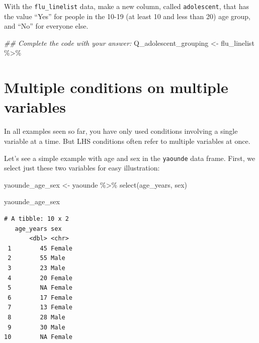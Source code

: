 \documentclass[
  letterpaper,
  DIV=11,
  numbers=noendperiod]{scrreprt}
\newenvironment{Shaded}{\begin{snugshade}}{\end{snugshade}}
\newcommand{\DocumentationTok}[1]{\textcolor[rgb]{0.37,0.37,0.37}{\textit{#1}}}
\newcommand{\FunctionTok}[1]{\textcolor[rgb]{0.28,0.35,0.67}{#1}}
\newcommand{\NormalTok}[1]{\textcolor[rgb]{0.00,0.23,0.31}{#1}}
\newcommand{\OtherTok}[1]{\textcolor[rgb]{0.00,0.23,0.31}{#1}}
\newcommand{\SpecialCharTok}[1]{\textcolor[rgb]{0.37,0.37,0.37}{#1}}
\begin{document}
\begin{tcolorbox}[enhanced jigsaw, title=\textcolor{quarto-callout-tip-color}{\faLightbulb}\hspace{0.5em}{Practice}, colbacktitle=quarto-callout-tip-color!10!white, leftrule=.75mm, arc=.35mm, opacityback=0, bottomrule=.15mm, rightrule=.15mm, toptitle=1mm, breakable, toprule=.15mm, colback=white, coltitle=black, colframe=quarto-callout-tip-color-frame, bottomtitle=1mm, titlerule=0mm, left=2mm, opacitybacktitle=0.6]

With the \texttt{flu\_linelist} data, make a new column, called
\texttt{adolescent}, that has the value ``Yes'' for people in the 10-19
(at least 10 and less than 20) age group, and ``No'' for everyone else.

\begin{Shaded}
\begin{Highlighting}[]
\DocumentationTok{\#\# Complete the code with your answer:}
\NormalTok{Q\_adolescent\_grouping }\OtherTok{\textless{}{-}} 
\NormalTok{  flu\_linelist }\SpecialCharTok{\%\textgreater{}\%} 
\end{Highlighting}
\end{Shaded}

\end{tcolorbox}

\section{Multiple conditions on multiple
variables}\label{multiple-conditions-on-multiple-variables}

In all examples seen so far, you have only used conditions involving a
single variable at a time. But LHS conditions often refer to multiple
variables at once.

Let's see a simple example with age and sex in the \texttt{yaounde} data
frame. First, we select just these two variables for easy illustration:

\begin{Shaded}
\begin{Highlighting}[]
\NormalTok{yaounde\_age\_sex }\OtherTok{\textless{}{-}} 
\NormalTok{  yaounde }\SpecialCharTok{\%\textgreater{}\%} 
  \FunctionTok{select}\NormalTok{(age\_years, sex)}

\NormalTok{yaounde\_age\_sex}
\end{Highlighting}
\end{Shaded}

\begin{verbatim}
# A tibble: 10 x 2
   age_years sex   
       <dbl> <chr> 
 1        45 Female
 2        55 Male  
 3        23 Male  
 4        20 Female
 5        NA Female
 6        17 Female
 7        13 Female
 8        28 Male  
 9        30 Male  
10        NA Female
\end{verbatim}
\end{document}

